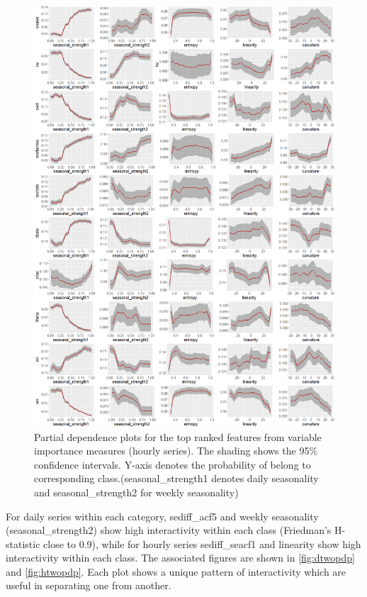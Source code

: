 \documentclass[11pt,a4paper,]{article}
\begin{document}
\begin{figure}
\centering
\includegraphics{figures/hourlypdp-1.png}
\caption{\label{fig:hourlypdp}Partial dependence plots for the top ranked
features from variable importance measures (hourly series). The shading
shows the 95\% confidence intervals. Y-axis denotes the probability of
belong to corresponding class.(seasonal\_strength1 denotes daily
seasonality and seasonal\_strength2 for weekly seasonality)}
\end{figure}

For daily series within each category, sediff\_acf5 and weekly
seasonality (seasonal\_strength2) show high interactivity within each
class (Friedman's H-statistic close to 0.9), while for hourly series
sediff\_seacf1 and linearity show high interactivity within each class.
The associated figures are shown in \autoref{fig:dtwopdp} and
\autoref{fig:htwopdp}. Each plot shows a unique pattern of interactivity
which are useful in separating one from another.
\end{document}
